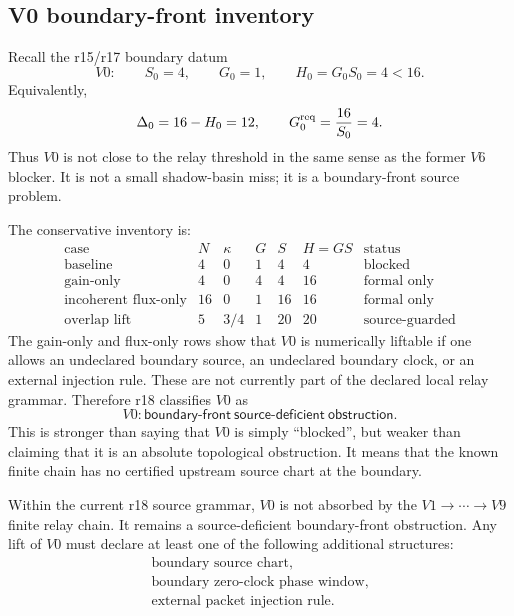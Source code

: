 \subsection{V0 boundary-front inventory}
\label{subsec:v470-r18-v0-boundary-front-inventory}

Recall the r15/r17 boundary datum
\[
V0:
\qquad
S_0=4,
\qquad
G_0=1,
\qquad
H_0=G_0S_0=4<16.
\]
Equivalently,
\[
\Delta_0=16-H_0=12,
\qquad
G_0^{\rm req}=\frac{16}{S_0}=4.
\]
Thus \(V0\) is not close to the relay threshold in the same sense as the former
\(V6\) blocker.  It is not a small shadow-basin miss; it is a boundary-front
source problem.

The conservative inventory is:
\[
\begin{array}{c|c|c|c|c|c|c}
\text{case} & N & \kappa & G & S & H=GS & \text{status}\\
\hline
\text{baseline} &4&0&1&4&4&\text{blocked}\\
\text{gain-only} &4&0&4&4&16&\text{formal only}\\
\text{incoherent flux-only} &16&0&1&16&16&\text{formal only}\\
\text{overlap lift} &5&3/4&1&20&20&\text{source-guarded}
\end{array}
\]
The gain-only and flux-only rows show that \(V0\) is numerically liftable if one
allows an undeclared boundary source, an undeclared boundary clock, or an
external injection rule.  These are not currently part of the declared local
relay grammar.  Therefore r18 classifies \(V0\) as
\[
\boxed{
V0:
\mathsf{boundary\mbox{-}front\ source\mbox{-}deficient\ obstruction}.
}
\]
This is stronger than saying that \(V0\) is simply ``blocked'', but weaker than
claiming that it is an absolute topological obstruction.  It means that the
known finite chain has no certified upstream source chart at the boundary.

\begin{lemma}
\label{lem:v470-r18-v0-boundary-front-decision}
Within the current r18 source grammar, \(V0\) is not absorbed by the
\(V1\to\cdots\to V9\) finite relay chain.  It remains a source-deficient
boundary-front obstruction.  Any lift of \(V0\) must declare at least one of the
following additional structures:
\[
\begin{gathered}
\text{boundary source chart},
\\
\text{boundary zero-clock phase window},
\\
\text{external packet injection rule}.
\end{gathered}
\]
\end{lemma}

